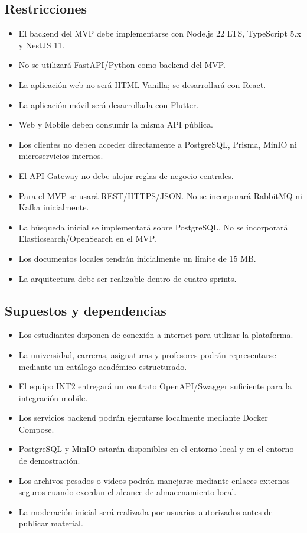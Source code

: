 \documentclass[12pt,a4paper]{article}
\begin{document}
\subsection{Restricciones}

\begin{itemize}
    \item El backend del MVP debe implementarse con Node.js 22 LTS, TypeScript 5.x y NestJS 11.
    \item No se utilizará FastAPI/Python como backend del MVP.
    \item La aplicación web no será HTML Vanilla; se desarrollará con React.
    \item La aplicación móvil será desarrollada con Flutter.
    \item Web y Mobile deben consumir la misma API pública.
    \item Los clientes no deben acceder directamente a PostgreSQL, Prisma, MinIO ni microservicios internos.
    \item El API Gateway no debe alojar reglas de negocio centrales.
    \item Para el MVP se usará REST/HTTPS/JSON. No se incorporará RabbitMQ ni Kafka inicialmente.
    \item La búsqueda inicial se implementará sobre PostgreSQL. No se incorporará Elasticsearch/OpenSearch en el MVP.
    \item Los documentos locales tendrán inicialmente un límite de 15 MB.
    \item La arquitectura debe ser realizable dentro de cuatro sprints.
\end{itemize}

\subsection{Supuestos y dependencias}

\begin{itemize}
    \item Los estudiantes disponen de conexión a internet para utilizar la plataforma.
    \item La universidad, carreras, asignaturas y profesores podrán representarse mediante un catálogo académico estructurado.
    \item El equipo INT2 entregará un contrato OpenAPI/Swagger suficiente para la integración mobile.
    \item Los servicios backend podrán ejecutarse localmente mediante Docker Compose.
    \item PostgreSQL y MinIO estarán disponibles en el entorno local y en el entorno de demostración.
    \item Los archivos pesados o videos podrán manejarse mediante enlaces externos seguros cuando excedan el alcance de almacenamiento local.
    \item La moderación inicial será realizada por usuarios autorizados antes de publicar material.
\end{itemize}
\end{document}
